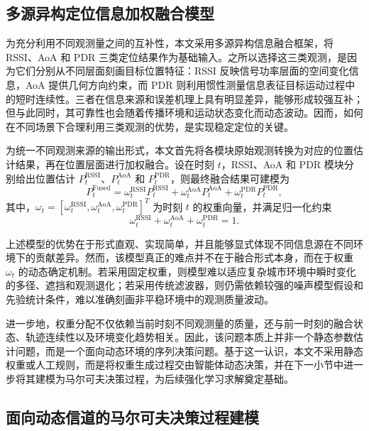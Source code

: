 \subsection{多源异构定位信息加权融合模型}
\label{subsec:3_1_2}

为充分利用不同观测量之间的互补性，本文采用多源异构信息融合框架，将 RSSI、AoA 和 PDR 三类定位结果作为基础输入。之所以选择这三类观测，是因为它们分别从不同层面刻画目标位置特征：RSSI 反映信号功率层面的空间变化信息，AoA 提供几何方向约束，而 PDR 则利用惯性测量信息表征目标运动过程中的短时连续性。三者在信息来源和误差机理上具有明显差异，能够形成较强互补；但与此同时，其可靠性也会随着传播环境和运动状态变化而动态波动。因而，如何在不同场景下合理利用三类观测的优势，是实现稳定定位的关键。

为统一不同观测来源的输出形式，本文首先将各模块原始观测转换为对应的位置估计结果，再在位置层面进行加权融合。设在时刻 \(t\)，RSSI、AoA 和 PDR 模块分别给出位置估计 \(P_t^{\mathrm{RSSI}}\)、\(P_t^{\mathrm{AoA}}\) 和 \(P_t^{\mathrm{PDR}}\)，则最终融合结果可建模为
\begin{equation}
P_t^{\mathrm{Fused}}
=
\omega_t^{\mathrm{RSSI}} P_t^{\mathrm{RSSI}}
+
\omega_t^{\mathrm{AoA}} P_t^{\mathrm{AoA}}
+
\omega_t^{\mathrm{PDR}} P_t^{\mathrm{PDR}},
\label{eq:3_1_fusion_model}
\end{equation}
其中，\(\omega_t=[\omega_t^{\mathrm{RSSI}},\omega_t^{\mathrm{AoA}},\omega_t^{\mathrm{PDR}}]^T\) 为时刻 \(t\) 的权重向量，并满足归一化约束
\begin{equation}
\omega_t^{\mathrm{RSSI}}+\omega_t^{\mathrm{AoA}}+\omega_t^{\mathrm{PDR}}=1.
\label{eq:3_2_weight_constraint}
\end{equation}

上述模型的优势在于形式直观、实现简单，并且能够显式体现不同信息源在不同环境下的贡献差异。然而，该模型真正的难点并不在于融合形式本身，而在于权重 \(\omega_t\) 的动态确定机制。若采用固定权重，则模型难以适应复杂城市环境中瞬时变化的多径、遮挡和观测退化；若采用传统滤波器，则仍需依赖较强的噪声模型假设和先验统计条件，难以准确刻画非平稳环境中的观测质量波动。

进一步地，权重分配不仅依赖当前时刻不同观测量的质量，还与前一时刻的融合状态、轨迹连续性以及环境变化趋势相关。因此，该问题本质上并非一个静态参数估计问题，而是一个面向动态环境的序列决策问题。基于这一认识，本文不采用静态权重或人工规则，而是将权重生成过程交由智能体动态决策，并在下一小节中进一步将其建模为马尔可夫决策过程，为后续强化学习求解奠定基础。

\subsection{面向动态信道的马尔可夫决策过程建模}
\label{subsec:3_1_3}

